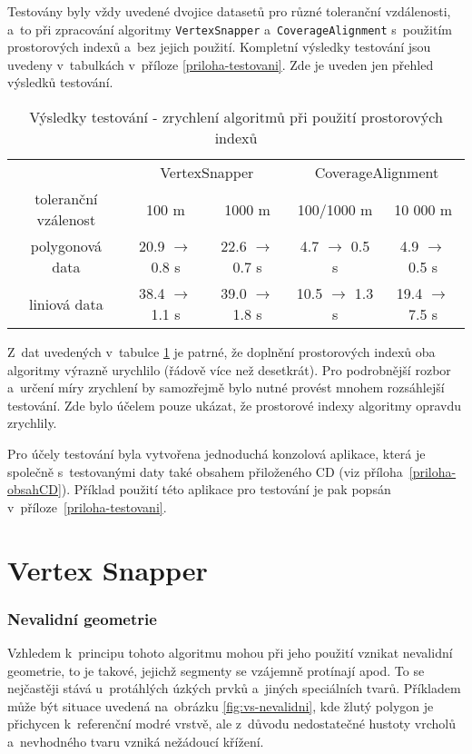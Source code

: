 Testovány byly vždy uvedené dvojice datasetů pro různé toleranční vzdálenosti,
a~to při zpracování algoritmy \texttt{Vertex\-Snapper} a~\texttt{Coverage\-Alignment}
s~použitím prostorových indexů a~bez jejich použití. Kompletní výsledky testování 
jsou uvedeny v~tabulkách v~příloze \ref{priloha-testovani}. Zde je uveden jen přehled 
výsledků testování.

\begin{table}[H]
 \centering
  \caption[Výsledky testování]{Výsledky testování - zrychlení algoritmů 
	  při použití prostorových indexů}
\begin{tabular}{|c|cc|cc|}
\hline
  & \multicolumn{2}{|c}{VertexSnapper} & \multicolumn{2}{|c|}{CoverageAlignment} \\
 toleranční vzálenost & 100 m & 1000 m & 100/1000 m & 10 000 m \\
\hline
\hline
 polygonová data & 20.9 $\rightarrow$ 0.8 s& 22.6 $\rightarrow$ 0.7 s& 
  4.7 $\rightarrow$ 0.5 s& 4.9 $\rightarrow$ 0.5 s\\
 liniová data & 38.4 $\rightarrow$ 1.1 s& 39.0 $\rightarrow$ 1.8 s& 
  10.5 $\rightarrow$ 1.3 s& 19.4 $\rightarrow$ 7.5 s\\
\hline
\end{tabular}
  \label{tab:vysledky}
\end{table}


Z~dat uvedených v~tabulce \ref{tab:vysledky} je patrné, že doplnění 
prostorových indexů oba algoritmy výrazně urychlilo (řádově více než 
desetkrát). Pro podrobnější rozbor a~určení míry zrychlení by 
samozřejmě bylo nutné provést mnohem rozsáhlejší tes\-tování. Zde bylo 
účelem pouze ukázat, že prostorové indexy algoritmy opravdu zrychlily.

Pro účely testování byla vytvořena jednoduchá konzolová aplikace, která je
spo\-lečně s~testovanými daty také obsahem přiloženého CD (viz 
příloha~\ref{priloha-obsahCD}). Příklad použití této aplikace pro testování je
pak popsán v~příloze~\ref{priloha-testovani}.

\section{Vertex Snapper}
\label{problemy-vs}

\subsubsection{Nevalidní geometrie}
Vzhledem k~principu tohoto algoritmu mohou při jeho použití vznikat nevalidní 
geometrie, to je takové, jejichž segmenty se vzájemně protínají apod. 
To se nejčastěji stává u~protáhlých úzkých prvků a~jiných speciálních tvarů. 
Příkladem může být situace uvedená na~obrázku \ref{fig:vs-nevalidni}, 
kde žlutý polygon je přichycen k~referenční modré vrstvě, ale z~důvodu 
nedostatečné hustoty vrcholů a~nevhodného tvaru vzniká nežádoucí křížení.

